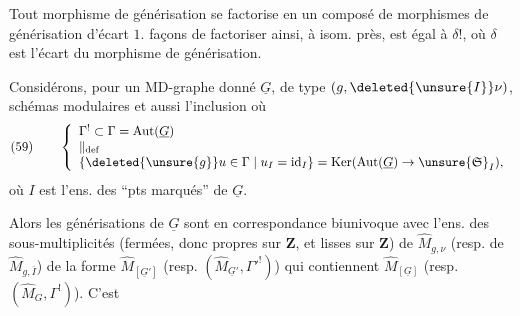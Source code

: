 Tout morphisme de générisation se factorise en un composé de morphismes de générisation d'écart $1$.   façons de factoriser ainsi, à isom. près, est égal à $\delta!$, où $\delta$ est l'écart du morphisme de générisation.

Considérons, pour un MD-graphe donné $\underline{G}$, de type  $(g,\deleted{\unsure{I}}\nu)$,   schémas modulaires 
et aussi l'inclusion
où
\[
\text{(59)}\qquad
\left\{\begin{array}{l}
\Gamma^!\subset\Gamma=\operatorname{Aut}(\underline G)\\
\Vert_{\mathrm{def}}\\
\{\deleted{\unsure{g}}u\in\Gamma\mid u_I=\operatorname{id}_I\}=\operatorname{Ker}(\operatorname{Aut}(\underline G)\to\unsure{\mathfrak S}_I),
\end{array}\right.
\]
où $I$ est l'ens. des ``pts marqués'' de $\underline G$.

Alors les  générisations de $\underline G$ sont en correspondance biunivoque avec l'ens. des sous-multiplicités (fermées,  donc propres sur $\mathbf Z$, et lisses sur $\mathbf Z$) de $\widehat M_{g,\nu}$ (resp. de $\widehat M_{g,\overline I}$) de la forme $\widehat M_{[\underline G']}$ (resp. $(\widehat M_{\underline G'},\Gamma'^!)$) qui contiennent $\widehat M_{[\underline G]}$ (resp. $(\widehat M_G,\Gamma^!)$). C'est
